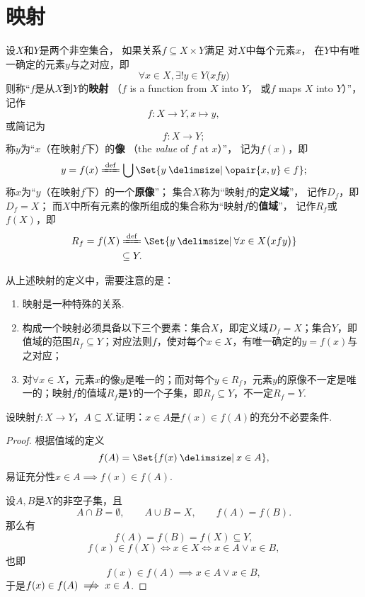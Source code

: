 \section{映射}
\begin{definition}
设\(X\)和\(Y\)是两个非空集合，%
如果关系\(f \subseteq X \times Y\)满足%
对\(X\)中每个元素\(x\)，%
在\(Y\)中有唯一确定的元素\(y\)与之对应，即\[
\forall x \in X,
\exists! y \in Y
\bigl( x f y \bigr)
\]则称“\(f\)是从\(X\)到\(Y\)的\textbf{映射}%
（\(f\) is a function from \(X\) into \(Y\)，%
或\(f\) maps \(X\) into \(Y\)）”，记作\[
f\colon X \to Y, x \mapsto y,
\]或简记为\[
f\colon X \to Y;
\]
称\(y\)为“\(x\)（在映射\(f\)下）的\textbf{像}%
（the \textit{value} of \(f\) at \(x\)）”，%
记为\(f(x)\)，即\[
y = f(x)
\defeq \bigcup\Set{ y \given \opair{x,y} \in f };
\]
称\(x\)为“\(y\)（在映射\(f\)下）的一个\textbf{原像}”；
集合\(X\)称为“映射\(f\)的\textbf{定义域}”，%
记作\(D_f\)，即\(D_f = X\)；
而\(X\)中所有元素的像所组成的集合称为“映射\(f\)的\textbf{值域}”，%
记作\(R_f\)或\(f(X)\)，即\[\begin{aligned}
R_f = f(X)
&\defeq \Set{ y \given \forall x \in X \bigl( x f y \bigr) } \\
&\subseteq Y.
\end{aligned}\]
\end{definition}

从上述映射的定义中，需要注意的是：
\begin{enumerate}
\item 映射是一种特殊的关系.
\item 构成一个映射必须具备以下三个要素：集合\(X\)，即定义域\(D_f = X\)；集合\(Y\)，即值域的范围\(R_f \subseteq Y\)；对应法则\(f\)，使对每个\(x \in X\)，有唯一确定的\(y=f(x)\)与之对应；
\item 对\(\forall x \in X\)，元素\(x\)的像\(y\)是唯一的；而对每个\(y \in R_f\)，元素\(y\)的原像不一定是唯一的；映射\(f\)的值域\(R_f\)是\(Y\)的一个子集，即\(R_f \subseteq Y\)，不一定\(R_f = Y\).
\end{enumerate}

\begin{example}
设映射\(f\colon X \to Y\)，\(A \subseteq X\).证明：\(x \in A\)是\(f(x) \in f(A)\)的充分不必要条件.
\begin{proof}
根据值域的定义\[
f(A) = \Set{ f(x) \given x \in A },
\]易证充分性\(x \in A \implies f(x) \in f(A)\).

设\(A,B\)是\(X\)的非空子集，且\[
A \cap B = \emptyset,
\qquad
A \cup B = X,
\qquad
f(A) = f(B).
\]那么有\[
f(A) = f(B) = f(X) \subseteq Y,
\]\[
f(x) \in f(X) \iff x \in X \iff x \in A \lor x \in B,
\]也即\[
f(x) \in f(A) \implies x \in A \lor x \in B,
\]于是\(f(x) \in f(A) \notimplies x \in A\).
\end{proof}
\end{example}

